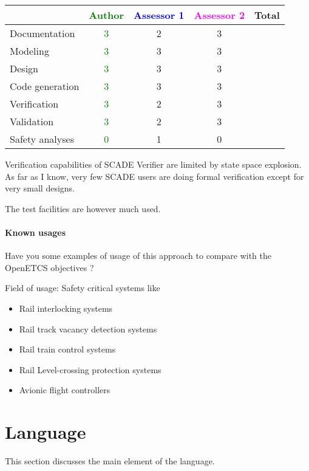 \begin{tabular}{|l | c | c | c | c|}
\hline
& \textcolor{green}{Author} & \textcolor{blue}{Assessor 1} & \textcolor{magenta}{Assessor 2} & Total \\
\hline 
Documentation &  \textcolor{green}{3}  & 2 &3 &  \\
\hline
Modeling &  \textcolor{green}{3}  & 3 &3 &  \\
\hline
Design &  \textcolor{green}{3}  & 3 &3 & \\
\hline
Code generation &  \textcolor{green}{3}  & 3 &3 & \\
\hline
Verification &  \textcolor{green}{3}  & 2 &3 & \\
\hline
Validation &  \textcolor{green}{3}  & 2 &3 & \\
\hline
Safety analyses &  \textcolor{green}{0}  & 1 &0 & \\
\hline
\end{tabular}


\begin{assessor1}
Verification capabilities of SCADE Verifier are limited by state space
explosion. As far as I know, very few SCADE users are doing formal
verification except for very small designs.

The test facilities are however much used.
\end{assessor1}


\paragraph{Known usages} Have you some examples of usage of this approach to  compare with the OpenETCS objectives ?

Field of usage: Safety critical systems like
\begin{itemize}
	\item Rail interlocking systems
	\item Rail track vacancy detection systems
	\item Rail train control systems
	\item Rail Level-crossing protection systems
	\item Avionic flight controllers
\end{itemize}

\section{Language}
This section discusses the main element of the language.

